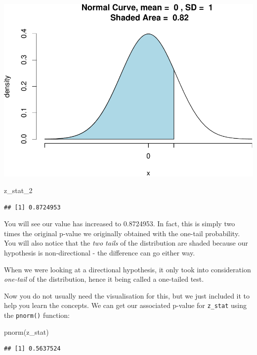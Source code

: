 \documentclass[
]{book}
\newenvironment{Shaded}{\begin{snugshade}}{\end{snugshade}}
\newcommand{\FunctionTok}[1]{\textcolor[rgb]{0.00,0.00,0.00}{#1}}
\newcommand{\NormalTok}[1]{#1}
\begin{document}
\includegraphics{06-hypotheses_files/figure-latex/unnamed-chunk-30-1.pdf}

\begin{Shaded}
\begin{Highlighting}[]
\NormalTok{z\_stat\_2 }
\end{Highlighting}
\end{Shaded}

\begin{verbatim}
## [1] 0.8724953
\end{verbatim}

You will see our value has increased to 0.8724953. In fact, this is simply two times the original p-value we originally obtained with the one-tail probability. You will also notice that the \emph{two tails} of the distribution are shaded because our hypothesis is non-directional - the difference can go either way.

When we were looking at a directional hypothesis, it only took into consideration \emph{one-tail} of the distribution, hence it being called a one-tailed test.

Now you do not usually need the visualisation for this, but we just included it to help you learn the concepts. We can get our associated p-value for \texttt{z\_stat} using the \texttt{pnorm()} function:

\begin{Shaded}
\begin{Highlighting}[]
\FunctionTok{pnorm}\NormalTok{(z\_stat)}
\end{Highlighting}
\end{Shaded}

\begin{verbatim}
## [1] 0.5637524
\end{verbatim}
\end{document}
